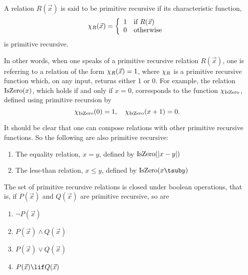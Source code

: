 \documentclass[../../../include/open-logic-section]{subfiles}
\begin{document}


\begin{defn}
A relation $R(\vec x)$ is said to be primitive recursive if its characteristic
function,
\[
\Char{R}(\vec x) = \left\{
  \begin{array}{ll}
  1 & \mbox{if $R(\vec x)$} \\
  0 & \mbox{otherwise}
  \end{array}
\right.
\]
is primitive recursive.
\end{defn}

In other words, when one speaks of a primitive recursive relation
$R(\vec x)$, one is referring to a relation of the form $\chi_{R}(\vec
x) = 1$, where $\chi_{R}$ is a primitive recursive function which, on
any input, returns either 1 or 0. For example, the relation
$\mathrm{IsZero}(x)$, which holds if and only if $x = 0$, corresponds to the
function $\chi_{\mathrm{IsZero}}$, defined using primitive recursion by
\[
\chi_{\mathrm{IsZero}}(0) = 1, \quad \chi_{\mathrm{IsZero}}(x+1) = 0.
\]

It should be clear that one can compose relations with other primitive
recursive functions. So the following are also primitive recursive:
\begin{enumerate}
\item The equality relation, $x = y$, defined by $\mathrm{IsZero}(\left|x -
  y\right|)$
\item The less-than relation, $x \leq y$, defined by $\fn{IsZero}(x
  \tsub y)$
\end{enumerate}


\begin{prop}
  The set of primitive recursive relations is closed under boolean
  operations, that is, 
  if $P(\vec x)$ and $Q(\vec x)$ are primitive recursive, so are
  \begin{enumerate}
  \item $\lnot P(\vec x)$
  \item $P(\vec x) \land Q(\vec x)$
  \item $P(\vec x) \lor Q(\vec x)$
  \item $P(\vec x) \lif Q(\vec x)$
  \end{enumerate}
\end{prop}
\end{document}

